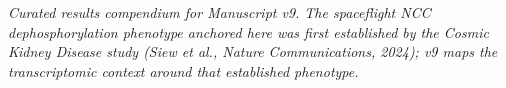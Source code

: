 \documentclass[10pt]{article}
\begin{document}
\vspace{1em}
\noindent\itshape Curated results compendium for Manuscript v9. The spaceflight NCC dephosphorylation phenotype anchored here was first established by the Cosmic Kidney Disease study (Siew et al., \emph{Nature Communications}, 2024); v9 maps the transcriptomic context around that established phenotype.
\end{document}
